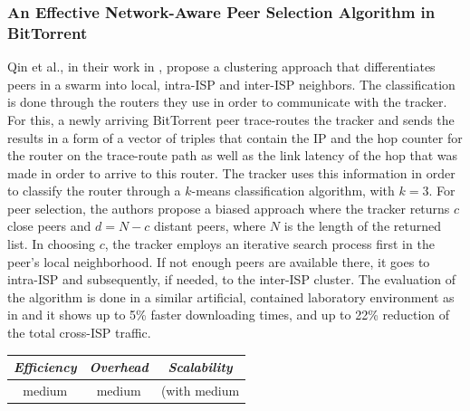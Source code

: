 \subsubsection{An Effective Network-Aware Peer Selection Algorithm in
BitTorrent}
Qin et al., in their work in \cite{QLZG2009}, propose a
clustering approach that differentiates peers in a swarm into local, intra-ISP
and inter-ISP neighbors. The classification is done through the routers they
use in order to communicate with the tracker. For this, a newly arriving
BitTorrent peer trace-routes the tracker and sends the results in a form of a
vector of triples that contain the IP and the hop counter for the router on the
trace-route path as well as the link latency of the hop that was made in order
to arrive to this router. The tracker uses this information in order to classify
the router through a $k$-means classification algorithm, with $k = 3$. For peer
selection, the authors propose a biased approach where the tracker returns $c$
close peers and $d = N - c$ distant peers, where $N$ is the length of the
returned list. In choosing $c$, the tracker employs an iterative search process
first in the peer's local neighborhood. If not enough peers are available
there, it goes to intra-ISP and subsequently, if needed, to the inter-ISP
cluster. The evaluation of the algorithm is done in a similar artificial,
contained laboratory environment as in \cite{LCY2008} and it shows up to
5\% faster downloading times, and up to 22\% reduction of the total cross-ISP
traffic.

\begin{center}
\begin{tabular}{ccc}
\emph{Efficiency} & \emph{Overhead} & \emph{Scalability} \\
\hline
medium &
medium &
(with
medium
\end{tabular}
\end{center}

